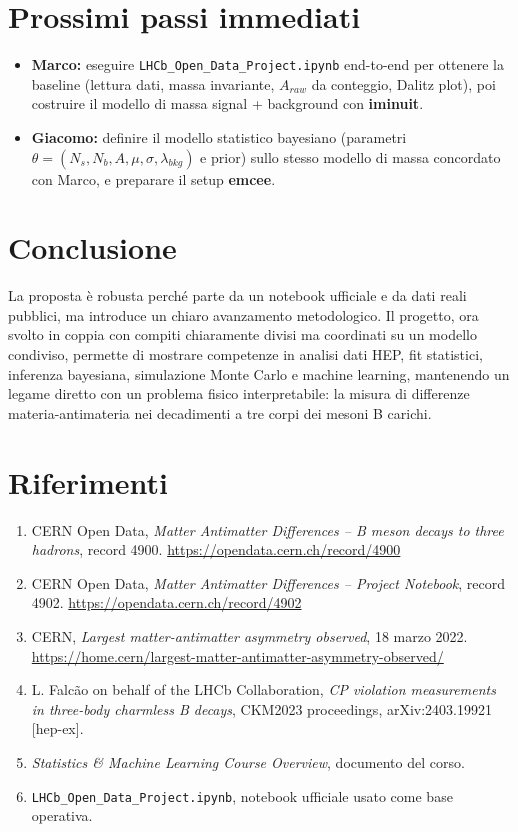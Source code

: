 \documentclass[11pt,a4paper]{article}
\begin{document}
\section{Prossimi passi immediati}
\begin{itemize}[leftmargin=1.4em]
    \item \textbf{Marco:} eseguire \texttt{LHCb\_Open\_Data\_Project.ipynb} end-to-end per ottenere la baseline (lettura dati, massa invariante, $A_{raw}$ da conteggio, Dalitz plot), poi costruire il modello di massa signal + background con \textbf{iminuit}.
    \item \textbf{Giacomo:} definire il modello statistico bayesiano (parametri $\theta = (N_s, N_b, A, \mu, \sigma, \lambda_{bkg})$ e prior) sullo stesso modello di massa concordato con Marco, e preparare il setup \textbf{emcee}.
\end{itemize}

\section{Conclusione}

La proposta è robusta perché parte da un notebook ufficiale e da dati reali pubblici, ma introduce un chiaro avanzamento metodologico. Il progetto, ora svolto in coppia con compiti chiaramente divisi ma coordinati su un modello condiviso, permette di mostrare competenze in analisi dati HEP, fit statistici, inferenza bayesiana, simulazione Monte Carlo e machine learning, mantenendo un legame diretto con un problema fisico interpretabile: la misura di differenze materia-antimateria nei decadimenti a tre corpi dei mesoni B carichi.

\section*{Riferimenti}
\begin{enumerate}[leftmargin=1.4em]
    \item CERN Open Data, \emph{Matter Antimatter Differences -- B meson decays to three hadrons}, record 4900. \url{https://opendata.cern.ch/record/4900}
    \item CERN Open Data, \emph{Matter Antimatter Differences -- Project Notebook}, record 4902. \url{https://opendata.cern.ch/record/4902}
    \item CERN, \emph{Largest matter-antimatter asymmetry observed}, 18 marzo 2022. \url{https://home.cern/largest-matter-antimatter-asymmetry-observed/}
    \item L. Falcão on behalf of the LHCb Collaboration, \emph{CP violation measurements in three-body charmless B decays}, CKM2023 proceedings, arXiv:2403.19921 [hep-ex].
    \item \emph{Statistics \& Machine Learning Course Overview}, documento del corso.
    \item \texttt{LHCb\_Open\_Data\_Project.ipynb}, notebook ufficiale usato come base operativa.
\end{enumerate}
\end{document}
